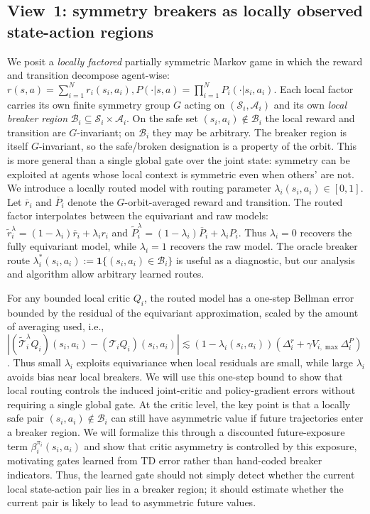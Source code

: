 \documentclass[11pt]{article}
\begin{document}
\subsection{View~1: symmetry breakers as locally observed state-action regions}
We posit a \emph{locally factored} partially symmetric Markov game in which the reward and transition decompose agent-wise:
$
r(s,a) = \sum_{i=1}^N r_i(s_i, a_i),
P(\cdot | s, a) = \prod_{i=1}^N P_i(\cdot | s_i, a_i)
$.
Each local factor carries its own finite symmetry group $G$ acting on $(\mathcal{S}_i, \mathcal{A}_i)$ and its own \emph{local breaker region} $\mathcal{B}_i \subseteq \mathcal{S}_i \times \mathcal{A}_i$. On the safe set $(s_i, a_i) \notin \mathcal{B}_i$ the local reward and transition are $G$-invariant; on $\mathcal{B}_i$ they may be arbitrary. The breaker region is itself $G$-invariant, so the safe/broken designation is a property of the orbit. This is more general than a single global gate over the joint state: symmetry can be exploited at agents whose local context is symmetric even when others' are not.
We introduce a locally routed model with routing parameter $\lambda_i(s_i,a_i) \in [0,1]$. Let $\overline r_i$ and $\overline P_i$ denote the $G$-orbit-averaged reward and transition. The routed factor interpolates between the equivariant and raw models: $\widetilde r_i^\lambda=(1-\lambda_i)\overline r_i+\lambda_i r_i$ and $\widetilde P_i^\lambda=(1-\lambda_i)\overline P_i+\lambda_i P_i$. Thus $\lambda_i=0$ recovers the fully equivariant model, while $\lambda_i=1$ recovers the raw model. The oracle breaker route $\lambda_i^*(s_i,a_i):=\mathbf{1}\{(s_i,a_i)\in\mathcal B_i\}$ is useful as a diagnostic, but our analysis and algorithm allow arbitrary learned routes.

For any bounded local critic $Q_i$, the routed model has a one-step Bellman error bounded by the residual of the equivariant approximation, scaled by the amount of averaging used, i.e., $|(\widetilde{\mathcal T}_i^\lambda Q_i)(s_i,a_i)-({\mathcal T}_i Q_i)(s_i,a_i)| \lesssim (1-\lambda_i(s_i,a_i))(\Delta_i^r+\gamma V_{i,\max}\Delta_i^P)$. Thus small $\lambda_i$ exploits equivariance when local residuals are small, while large $\lambda_i$ avoids bias near local breakers. We will use this one-step bound to show that local routing controls the induced joint-critic and policy-gradient errors without requiring a single global gate.
At the critic level, the key point is that a locally safe pair $(s_i,a_i)\notin\mathcal B_i$ can still have asymmetric value if future trajectories enter a breaker region. We will formalize this through a discounted future-exposure term $\beta_i^{\pi_i}(s_i,a_i)$ and show that critic asymmetry is controlled by this exposure, motivating gates learned from TD error rather than hand-coded breaker indicators.
Thus, the learned gate should not simply detect whether the current local state-action pair lies in a breaker region; it should estimate whether the current pair is likely to lead to asymmetric future values.
\end{document}
